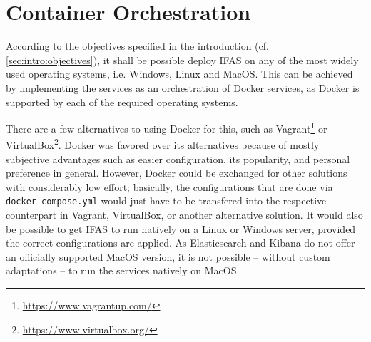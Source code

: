 \section{Container Orchestration}
\label{sec:classification:orchestration}

According to the objectives specified in the introduction (cf. \cref{sec:intro:objectives}), it shall be possible deploy \ac{IFAS} on any of the most widely used operating systems, i.e. Windows, Linux and MacOS.
This can be achieved by implementing the services as an orchestration of Docker services, as Docker is supported by each of the required operating systems.

There are a few alternatives to using Docker for this, such as Vagrant\footnote{\url{https://www.vagrantup.com/}} or VirtualBox\footnote{\url{https://www.virtualbox.org/}}.
Docker was favored  over its alternatives because of mostly subjective advantages such as easier configuration, its popularity, and personal preference in general.
However, Docker could be exchanged for other solutions with considerably low effort; basically, the configurations that are done via \texttt{docker-compose.yml} would just have to be transfered into the respective counterpart in Vagrant, VirtualBox, or another alternative solution.
It would also be possible to get \ac{IFAS} to run natively on a Linux or Windows server, provided the correct configurations are applied.
As Elasticsearch and Kibana do not offer an officially supported MacOS version, it is not possible -- without custom adaptations -- to run the services natively on MacOS.
